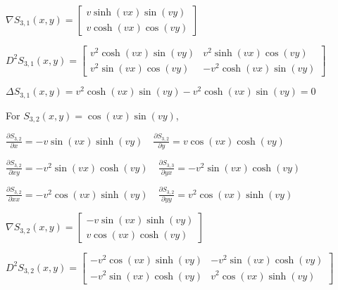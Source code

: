 \documentclass[12pt, executivepaper]{article}
\begin{document}
\begin{flushleft}
\vspace{3mm}

$\nabla S_{3,1}(x,y)=
\begin{bmatrix}
v\sinh(vx)\sin(vy) \\
v\cosh(vx)\cos(vy)
\end{bmatrix}$

\vspace{3mm}

$D^2 S_{3,1}(x,y)=
\begin{bmatrix}
v^2\cosh(vx)\sin(vy) & v^2\sinh(vx)\cos(vy) \\
v^2\sin(vx)\cos(vy) & -v^2\cosh(vx)\sin(vy)
\end{bmatrix}$

\vspace{3mm}

$\Delta S_{3,1}(x,y)=v^2\cosh(vx)\sin(vy)-v^2\cosh(vx)\sin(vy)=0$

\vspace{5mm}

For $S_{3,2}(x,y)=\cos(vx)\sin(vy)$, \\

\vspace{3mm}

$\frac{\partial S_{3,2}}{\partial x}=-v\sin(vx)\sinh(vy) \quad \frac{\partial S_{3,2}}{\partial y}=v\cos(vx)\cosh(vy)$ \\

\vspace{3mm}

$\frac{\partial S_{3,2}}{\partial xy}=-v^2\sin(vx)\cosh(vy) \quad \frac{\partial S_{3,3}}{\partial yx}=-v^2\sin(vx)\cosh(vy)$ \\

\vspace{3mm}

$\frac{\partial S_{3,2}}{\partial xx}=-v^2\cos(vx)\sinh(vy) \quad \frac{\partial S_{3,2}}{\partial yy}=v^2\cos(vx)\sinh(vy)$ \\

\vspace{3mm}

$\nabla S_{3,2}(x,y)=
\begin{bmatrix}
-v\sin(vx)\sinh(vy) \\
v\cos(vx)\cosh(vy)
\end{bmatrix}$

\vspace{3mm}

$D^2 S_{3,2}(x,y)=
\begin{bmatrix}
-v^2\cos(vx)\sinh(vy) & -v^2\sin(vx)\cosh(vy) \\
-v^2\sin(vx)\cosh(vy) & v^2\cos(vx)\sinh(vy)
\end{bmatrix}$


\end{flushleft}
\end{document}
